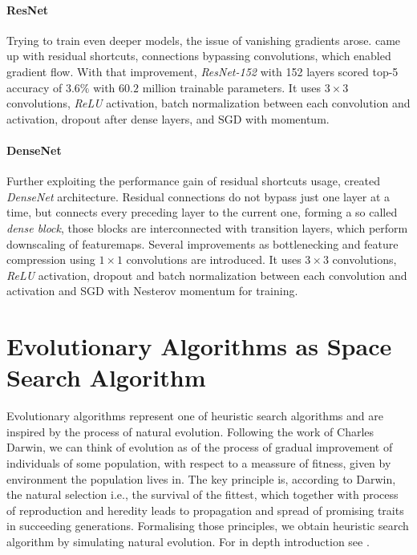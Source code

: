 \paragraph{ResNet}
Trying to train even deeper models, the issue of vanishing gradients arose. \cite{DBLP:journals/corr/HeZRS15} came up with residual shortcuts, connections bypassing convolutions, which enabled gradient flow. With that improvement, \textit{ResNet-152} with 152 layers scored top-5 accuracy of $3.6\%$ with $60.2$ million trainable parameters. It uses $3 \times 3$ convolutions, \textit{ReLU} activation, batch normalization between each convolution and activation, dropout after dense layers, and SGD with momentum.

\paragraph{DenseNet}
Further exploiting the performance gain of residual shortcuts usage, \cite{DBLP:journals/corr/HuangLW16a} created \textit{DenseNet} architecture. Residual connections do not bypass just one layer at a time, but connects every preceding layer to the current one, forming a so called \textit{dense block}, those blocks are interconnected with transition layers, which perform downscaling of featuremaps. Several improvements as bottlenecking and feature compression using $1 \times 1$ convolutions are introduced. It uses $3 \times 3$ convolutions, \textit{ReLU} activation, dropout and batch normalization between each convolution and activation and SGD with Nesterov momentum for training.

\section{Evolutionary Algorithms as Space Search Algorithm}
Evolutionary algorithms represent one of heuristic search algorithms and are inspired by the process of natural evolution. Following the work of Charles Darwin, we can think of evolution as of the process of gradual improvement of individuals of some population, with respect to a meassure of fitness, given by environment the population lives in. The key principle is, according to Darwin, the natural selection i.e., the survival of the fittest, which together with process of reproduction and heredity leads to propagation and spread of promising traits in succeeding generations. Formalising those principles, we obtain heuristic search algorithm by simulating natural evolution. For in depth introduction see \cite{evolution}.

